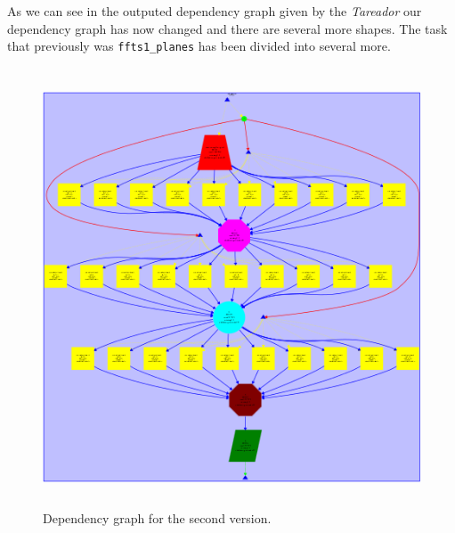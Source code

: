 \documentclass[12]{article}
\begin{document}
As we can see in the outputed dependency graph given by the \textit{Tareador} our dependency graph has now changed and there are several more shapes. The task that previously was \texttt{ffts1\_planes} has been divided into several more. 
\begin{figure}[H]
\centering  \includegraphics[width=\linewidth , height=13cm, width=13cm ]{images/dependency_graph2.png}
  \caption{Dependency graph for the second version.}
  \label{fig:Depencency2nd}
\end{figure}
\end{document}
